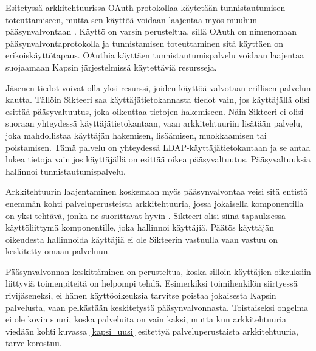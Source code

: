 Esitetyssä arkkitehtuurissa OAuth-protokollaa käytetään tunnistautumisen toteuttamiseen, mutta sen käyttöä voidaan laajentaa myös muuhun pääsynvalvontaan \cite{distributed_web_security}. Käyttö on varsin perusteltua, sillä OAuth on nimenomaan pääsynvalvontaprotokolla ja tunnistamisen toteuttaminen sitä käyttäen on erikoiskäyttötapaus. OAuthia käyttäen tunnistautumispalvelu voidaan laajentaa suojaamaan Kapsin järjestelmissä käytettäviä resursseja.

Jäsenen tiedot voivat olla yksi resurssi, joiden käyttöä valvotaan erillisen pal\-ve\-lun kautta. Tällöin Sikteeri saa käyttäjätietokannasta tiedot vain, jos käyttäjällä olisi esittää pääsyvaltuutus, joka oikeuttaa tietojen hakemiseen. Näin Sikteeri ei olisi suoraan yhteydessä käyttäjätietokantaan, vaan arkkitehtuuriin lisätään palvelu, joka mahdollistaa käyttäjän hakemisen, lisäämisen, muokkaamisen tai poistamisen. Tämä palvelu on yhteydessä LDAP-käyttäjätietokantaan ja se antaa lukea tietoja vain jos käyttäjällä on esittää oikea pääsyvaltuutus. Pääsyvaltuuksia hallinnoi tunnistautumispalvelu.

Arkkitehtuurin laajentaminen koskemaan myös pääsynvalvontaa veisi sitä entistä enemmän kohti palveluperusteista arkkitehtuuria, jossa jokaisella komponentilla on yksi tehtävä, jonka ne suorittavat hyvin \cite{soa}. Sikteeri olisi siinä tapauksessa käyttöliittymä komponentille, joka hallinnoi käyttäjiä. Päätös käyttäjän oikeudesta hallinnoida käyttäjiä ei ole Sikteerin vastuulla vaan vastuu on keskitetty omaan palveluun.

Pääsynvalvonnan keskittäminen on perusteltua, koska silloin käyttäjien oikeuksiin liittyviä toimenpiteitä on helpompi tehdä. Esimerkiksi toimihenkilön siirtyessä rivijäseneksi, ei hänen käyttöoikeuksia tarvitse poistaa jokaisesta Kapsin palvelusta, vaan pelkästään keskitetystä pääsynvalvonnasta. Toistaiseksi ongelma ei ole kovin suuri, koska palveluita on vain kaksi, mutta kun arkkitehtuuria viedään kohti kuvassa \ref{kapsi_uusi} esitettyä palveluperustaista arkkitehtuuria, tarve korostuu.
